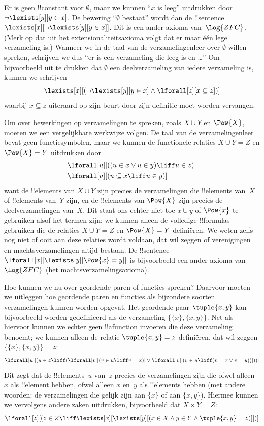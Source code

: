 \documentclass[../../../include/open-logic-section]{subfiles}
\begin{document}
Er is geen !!{constant} voor $\emptyset$, maar we kunnen ``$x$ is
leeg'' uitdrukken door $\lnot \lexists[y][y \in x]$. De bewering
``$\emptyset$ bestaat'' wordt dan de !!{sentence}~$\lexists[x][\lnot
\lexists[y][y \in x]]$. Dit is een ander axioma van~$\Log{ZFC}$.
(Merk op dat uit het extensionaliteitsaxioma volgt dat er maar één lege
verzameling is.) Wanneer we in de taal van de verzamelingenleer over
$\emptyset$ willen spreken, schrijven we dus ``er is een verzameling
die leeg is en \dots'' Om bijvoorbeeld uit te drukken dat $\emptyset$
een deelverzameling van iedere verzameling is, kunnen we schrijven
\[
\lexists[x][(\lnot\lexists[y][y \in x] \land \lforall[z][x \subseteq
    z])]
\]
waarbij $x \subseteq z$ uiteraard op zijn beurt door zijn definitie
moet worden vervangen.

Om over bewerkingen op verzamelingen te spreken, zoals $X \cup Y$ en
$\Pow{X}$, moeten we een vergelijkbare werkwijze volgen. De taal van de
verzamelingenleer bevat geen functiesymbolen, maar we kunnen de
functionele relaties $X \cup Y = Z$ en $\Pow{X} = Y$ uitdrukken door
\begin{align*}
& \lforall[u][((u \in x \lor u \in y) \liff u \in z)]\\
& \lforall[u][(u \subseteq x \liff u \in y )]
\end{align*}
want de !!{element}s van $X \cup Y$ zijn precies de verzamelingen die
!!{element}s van~$X$ of !!{element}s van~$Y$ zijn, en de !!{element}s
van $\Pow{X}$ zijn precies de deelverzamelingen van~$X$. Dit staat ons
echter niet toe $x \cup y$ of $\Pow{x}$ te gebruiken alsof het termen
zijn: we kunnen alleen de volledige !!{formula}s gebruiken die de
relaties $X \cup Y = Z$ en $\Pow{X} = Y$ definiëren. We weten zelfs nog
niet of ooit aan deze relaties wordt voldaan, dat wil zeggen of
verenigingen en machtsverzamelingen altijd bestaan. De !!{sentence}
$\lforall[x][\lexists[y][\Pow{x} = y]]$ is bijvoorbeeld een ander
axioma van~$\Log{ZFC}$ (het machtsverzamelingsaxioma).

Hoe kunnen we nu over geordende paren of functies spreken? Daarvoor
moeten we uitleggen hoe geordende paren en functies als bijzondere
soorten verzamelingen kunnen worden opgevat. Het geordende paar
$\tuple{x, y}$ kan bijvoorbeeld worden gedefinieerd als de verzameling
$\{\{x\}, \{x, y\}\}$. Net als hiervoor kunnen we echter geen
!!a{function} invoeren die deze verzameling benoemt; we kunnen alleen
de relatie $\tuple{x, y} = z$ definiëren, dat wil zeggen
$\{\{x\}, \{x, y\}\} = z$:
\[
\lforall[u][(u \in z \liff (\lforall[v][(v \in u \liff v = x)] \lor
  \lforall[v][(v \in u \liff (v = x \lor v = y))]))]
\]
Dit zegt dat de !!{element}s~$u$ van~$z$ precies de verzamelingen zijn
die ofwel alleen $x$ als !!{element} hebben, ofwel alleen $x$ en~$y$ als
!!{element}s hebben (met andere woorden: de verzamelingen die gelijk
zijn aan $\{x\}$ of aan $\{x, y\}$). Hiermee kunnen we vervolgens
andere zaken uitdrukken, bijvoorbeeld dat $X \times Y = Z$:
\[
\lforall[z][(z \in Z \liff \lexists[x][\lexists[y][(x \in
        X \land y \in Y \land \tuple{x, y} = z)]])]
\]
\end{document}
